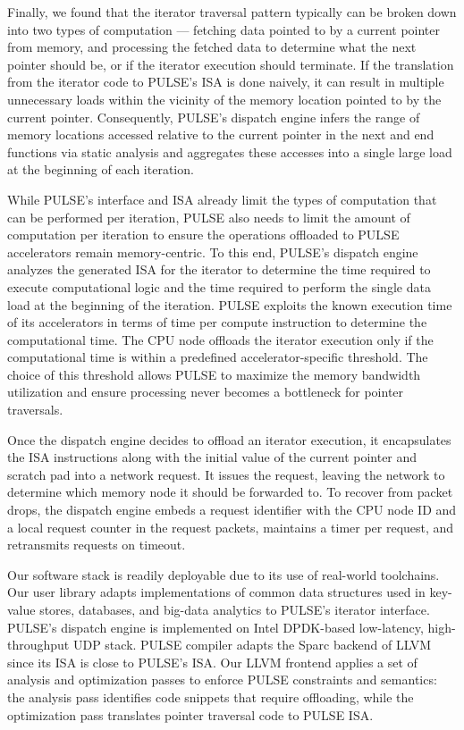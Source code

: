 Finally, we found that the iterator traversal pattern typically can be broken down into two types of computation — fetching data pointed to by a current pointer from memory, and processing the fetched data to determine what the next pointer should be, or if the iterator execution should terminate. If the translation from the iterator code to PULSE's ISA is done naively, it can result in multiple unnecessary loads within the vicinity of the memory location pointed to by the current pointer. Consequently, PULSE's dispatch engine infers the range of memory locations accessed relative to the current pointer in the next and end functions via static analysis and aggregates these accesses into a single large load at the beginning of each iteration.

While PULSE's interface and ISA already limit the types of computation that can be performed per iteration, PULSE also needs to limit the amount of computation per iteration to ensure the operations offloaded to PULSE accelerators remain memory-centric. To this end, PULSE's dispatch engine analyzes the generated ISA for the iterator to determine the time required to execute computational logic and the time required to perform the single data load at the beginning of the iteration. PULSE exploits the known execution time of its accelerators in terms of time per compute instruction to determine the computational time. The CPU node offloads the iterator execution only if the computational time is within a predefined accelerator-specific threshold. The choice of this threshold allows PULSE to maximize the memory bandwidth utilization and ensure processing never becomes a bottleneck for pointer traversals.

Once the dispatch engine decides to offload an iterator execution, it encapsulates the ISA instructions along with the initial value of the current pointer and scratch pad into a network request. It issues the request, leaving the network to determine which memory node it should be forwarded to. To recover from packet drops, the dispatch engine embeds a request identifier with the CPU node ID and a local request counter in the request packets, maintains a timer per request, and retransmits requests on timeout.

Our software stack is readily deployable due to its use of real-world toolchains. Our user library adapts implementations of common data structures used in key-value stores, databases, and big-data analytics to PULSE's iterator interface. PULSE's dispatch engine is implemented on Intel DPDK-based low-latency, high-throughput UDP stack. PULSE compiler adapts the Sparc backend of LLVM since its ISA is close to PULSE's ISA. Our LLVM frontend applies a set of analysis and optimization passes to enforce PULSE constraints and semantics: the analysis pass identifies code snippets that require offloading, while the optimization pass translates pointer traversal code to PULSE ISA.


